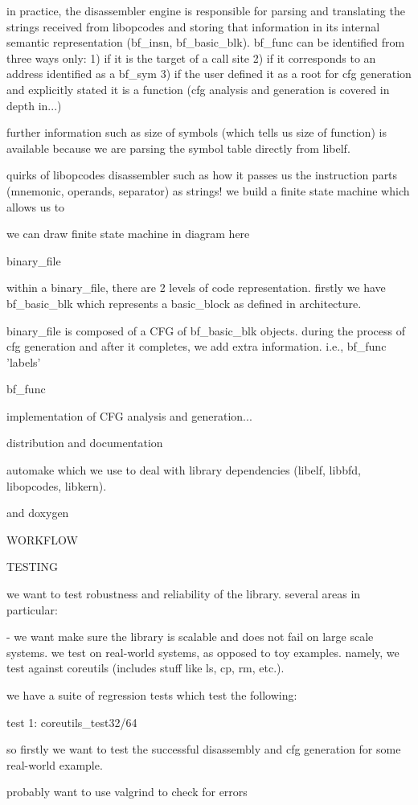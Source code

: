 in practice, the disassembler engine is responsible for parsing and translating the strings received from libopcodes and storing that information in its internal semantic representation (bf\_insn, bf\_basic\_blk). bf\_func can be identified from three ways only:
1) if it is the target of a call site
2) if it corresponds to an address identified as a bf\_sym
3) if the user defined it as a root for cfg generation and explicitly stated it is a function (cfg analysis and generation is covered in depth in...)

further information such as size of symbols (which tells us size of function) is available because we are parsing the symbol table directly from libelf.

quirks of libopcodes disassembler such as how it passes us the instruction parts (mnemonic, operands, separator) as strings! we build a finite state machine which allows us to 

we can draw finite state machine in diagram here

binary\_file

within a binary\_file, there are 2 levels of code representation. firstly we have bf\_basic\_blk which represents a basic\_block as defined in architecture.

binary\_file is composed of a CFG of bf\_basic\_blk objects. during the process of cfg generation and after it completes, we add extra information. i.e., bf\_func 'labels'

bf\_func

implementation of CFG analysis and generation...

distribution and documentation

automake which we use to deal with library dependencies (libelf, libbfd, libopcodes, libkern).

 and doxygen

WORKFLOW



TESTING

we want to test robustness and reliability of the library. several areas in particular:

- we want make sure the library is scalable and does not fail on large scale systems. we test on real-world systems, as opposed to toy examples. namely, we test against coreutils (includes stuff like ls, cp, rm, etc.).

we have a suite of regression tests which test the following:

test 1: coreutils\_test32/64

so firstly we want to test the successful disassembly and cfg generation for some real-world example. 

probably want to use valgrind to check for errors